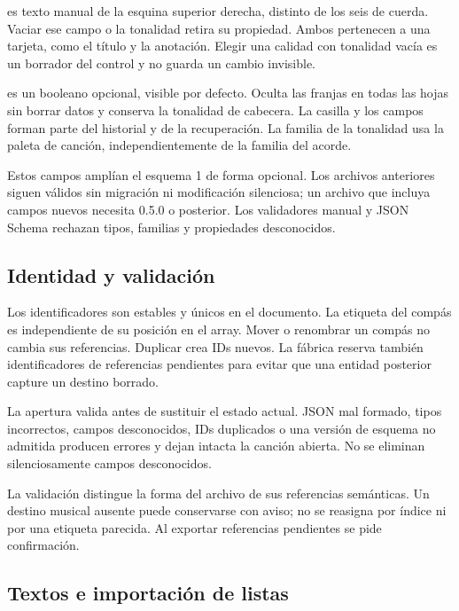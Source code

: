 \documentclass[a4paper,11pt]{article}
\let\originaltexttt\texttt
\renewcommand{\texttt}[1]{\originaltexttt{\seqsplit{#1}}}
\begin{document}
\texttt{voicingDegree} es texto manual de la esquina superior derecha,
distinto de los seis \texttt{degrees} de cuerda. Vaciar ese campo o la
tonalidad retira su propiedad. Ambos pertenecen a una tarjeta, como el
título y la anotación. Elegir una calidad con tonalidad vacía es un
borrador del control y no guarda un cambio invisible.

\texttt{showTonalities} es un booleano opcional, visible por defecto.
Oculta las franjas en todas las hojas sin borrar datos y conserva la
tonalidad de cabecera. La casilla y los campos forman parte del
historial y de la recuperación. La familia de la tonalidad usa la paleta
de canción, independientemente de la familia del acorde.

Estos campos amplían el esquema 1 de forma opcional. Los archivos
anteriores siguen válidos sin migración ni modificación silenciosa; un
archivo que incluya campos nuevos necesita 0.5.0 o posterior. Los
validadores manual y JSON Schema rechazan tipos, familias y propiedades
desconocidos.

\subsection{Identidad y validación}\label{identidad-y-validaciuxf3n}

Los identificadores son estables y únicos en el documento. La etiqueta
del compás es independiente de su posición en el array. Mover o
renombrar un compás no cambia sus referencias. Duplicar crea IDs nuevos.
La fábrica reserva también identificadores de referencias pendientes
para evitar que una entidad posterior capture un destino borrado.

La apertura valida antes de sustituir el estado actual. JSON mal
formado, tipos incorrectos, campos desconocidos, IDs duplicados o una
versión de esquema no admitida producen errores y dejan intacta la
canción abierta. No se eliminan silenciosamente campos desconocidos.

La validación distingue la forma del archivo de sus referencias
semánticas. Un destino musical ausente puede conservarse con aviso; no
se reasigna por índice ni por una etiqueta parecida. Al exportar
referencias pendientes se pide confirmación.

\subsection{Textos e importación de
listas}\label{textos-e-importaciuxf3n-de-listas}
\end{document}
